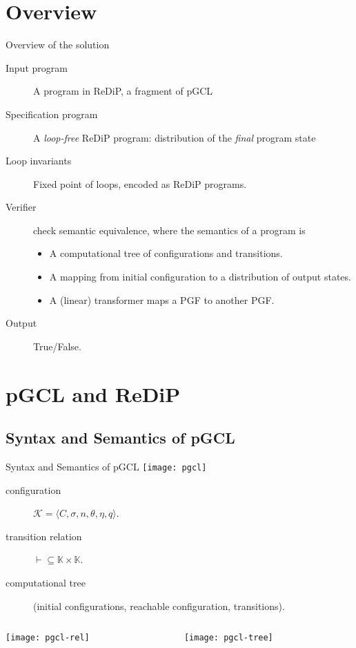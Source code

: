 \documentclass[8pt]{beamer}
\begin{document}
\section{Overview}
\begin{frame}{Overview of the solution}
	\begin{description}
		\item[Input program] A program in ReDiP, a fragment of pGCL
		\item[Specification program] A \emph{loop-free} ReDiP program: distribution of the \emph{final} program state
		\item[Loop invariants] Fixed point of loops, encoded as ReDiP programs.
		\item[Verifier] check semantic equivalence, where the semantics of a program is
		      \begin{itemize}
			      \item A computational tree of configurations and transitions.
			      \item A mapping from initial configuration to a distribution of output states.
			      \item A (linear) transformer maps a PGF to another PGF.
		      \end{itemize}
		\item[Output] True/False.
	\end{description}
\end{frame}

\section{pGCL and ReDiP}
\subsection{Syntax and Semantics of pGCL}
\begin{frame}[allowframebreaks]{Syntax and Semantics of pGCL\cite{pgcl}}
	\texttt{[image: pgcl]}
	\begin{description}
		\item[configuration] \(\mathcal{K} = \langle C,\sigma,n,\theta,\eta,q\rangle\).
		\item[transition relation] \(\vdash \subseteq \mathbb{K}\times\mathbb{K}\).
		\item[computational tree] (initial configurations, reachable configuration, transitions).
	\end{description}
	\framebreak
	\begin{columns}
		\begin{column}{0.5\textwidth}
			\texttt{[image: pgcl-rel]}
		\end{column}
		\begin{column}{0.5\textwidth}
			\texttt{[image: pgcl-tree]}
		\end{column}
	\end{columns}
\end{frame}
\end{document}
